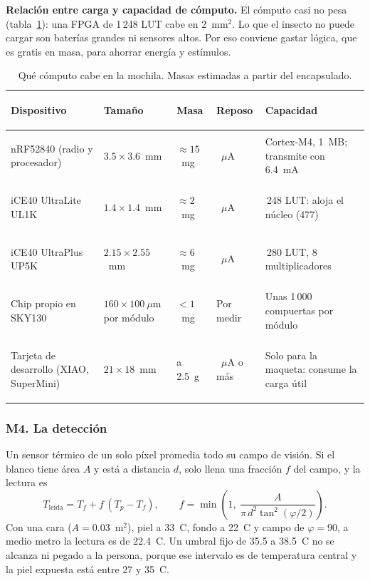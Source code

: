 \textbf{Relación entre carga y capacidad de cómputo.} El cómputo casi no pesa
(tabla~\ref{tab:computo}): una FPGA de 1\,248 LUT cabe en 2~mm$^2$. Lo que el insecto no
puede cargar son baterías grandes ni sensores altos. Por eso conviene gastar lógica, que es
gratis en masa, para ahorrar energía y estímulos.

\begin{table}[H]
\centering\footnotesize
\caption{Qué cómputo cabe en la mochila. Masas estimadas a partir del encapsulado.}
\label{tab:computo}
\begin{tabularx}{\textwidth}{@{}>{\bfseries\raggedright\arraybackslash}p{3.7cm} >{\raggedright\arraybackslash}p{2.6cm} >{\raggedright\arraybackslash}p{1.6cm} >{\raggedright\arraybackslash}p{2.2cm} >{\raggedright\arraybackslash}X@{}}
\toprule
\rowcolor{TableHead} Dispositivo & Tamaño & Masa & Reposo & Capacidad \\
\midrule
nRF52840 (radio y procesador)~\cite{nordic} & $3.5\times3.6$~mm & $\approx15$~mg & 0.4~$\mu$A & Cortex-M4, 1~MB; transmite con 6.4~mA \\
iCE40 UltraLite UL1K~\cite{lattice} & $1.4\times1.4$~mm & $\approx2$~mg & 35~$\mu$A & 1\,248 LUT: aloja el núcleo (477) \\
iCE40 UltraPlus UP5K~\cite{lattice} & $2.15\times2.55$~mm & $\approx6$~mg & 75~$\mu$A & 5\,280 LUT, 8 multiplicadores \\
Chip propio en SKY130~\cite{tinytapeout} & $160\times100~\mu$m por módulo & $<1$~mg & Por medir & Unas 1\,000 compuertas por módulo \\
Tarjeta de desarrollo (XIAO, SuperMini) & $21\times18$~mm & 1.5 a 2.5~g & 44~$\mu$A o más & Solo para la maqueta: consume la carga útil \\
\bottomrule
\end{tabularx}
\end{table}

\subsubsection{M4. La detección}
\label{sec:deteccion}

Un sensor térmico de un solo píxel promedia todo su campo de visión. Si el blanco tiene área
$A$ y está a distancia $d$, solo llena una fracción $f$ del campo, y la lectura es
\begin{equation}
T_{\text{leída}}=T_f+f\,(T_p-T_f),\qquad
f=\min\!\left(1,\ \frac{A}{\pi\,d^2\tan^2(\varphi/2)}\right).
\end{equation}
Con una cara ($A=0.03$~m$^2$), piel a 33~\textdegree C, fondo a 22~\textdegree C y campo de
$\varphi=90$\textdegree, a medio metro la lectura es de 22.4~\textdegree C. Un umbral fijo de
35.5 a 38.5~\textdegree C no se alcanza ni pegado a la persona, porque ese intervalo es de
temperatura central y la piel expuesta está entre 27 y 35~\textdegree C.

